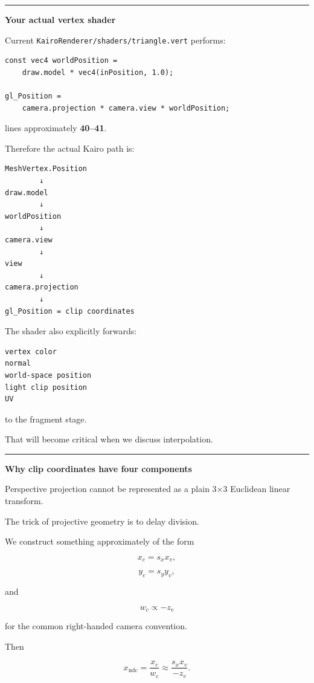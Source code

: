 \begin{center}\rule{0.5\linewidth}{0.5pt}\end{center}

\textbf{Your actual vertex shader}

Current \texttt{KairoRenderer/shaders/triangle.vert} performs:

\begin{verbatim}
const vec4 worldPosition =
    draw.model * vec4(inPosition, 1.0);

gl_Position =
    camera.projection * camera.view * worldPosition;
\end{verbatim}

lines approximately \textbf{40--41}.

Therefore the actual Kairo path is:

\begin{verbatim}
MeshVertex.Position
        ↓
draw.model
        ↓
worldPosition
        ↓
camera.view
        ↓
view
        ↓
camera.projection
        ↓
gl_Position = clip coordinates
\end{verbatim}

The shader also explicitly forwards:

\begin{verbatim}
vertex color
normal
world-space position
light clip position
UV
\end{verbatim}

to the fragment stage.

That will become critical when we discuss interpolation.

\begin{center}\rule{0.5\linewidth}{0.5pt}\end{center}

\textbf{Why clip coordinates have four components}

Perspective projection cannot be represented as a plain 3×3 Euclidean linear transform.

The trick of projective geometry is to delay division.

We construct something approximately of the form

\[
x_c = s_xx_v,
\]

\[
y_c = s_yy_v,
\]

and

\[
w_c \propto -z_v
\]

for the common right-handed camera convention.

Then

\[
x_{\text{ndc}}
=
\frac{x_c}{w_c}
\approx
\frac{s_xx_v}{-z_v}.
\]

